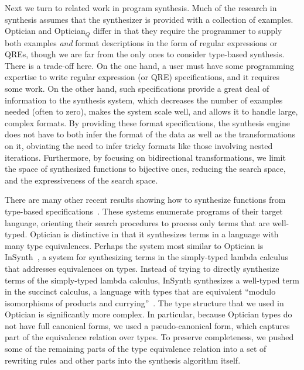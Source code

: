 \documentclass[acmsmall,review,anonymous]{acmart}
\begin{document}
Next we turn to related work in program synthesis. Much of the research in
synthesis 
assumes that the synthesizer is provided with a collection of examples.
Optician and Optician$_Q$  differ
in that they require the programmer to supply both examples {\em and}
format descriptions in the form of regular expressions or QREs, though we are
far from the only ones to consider type-based synthesis.
There is a trade-off here.  On the one hand, a user must have some programming
expertise to write regular expression (or QRE) specifications, and it requires
some work. On the other hand, such specifications provide a great deal of
information to the synthesis system, which decreases the number of examples
needed (often to zero), makes the system scale well, and allows it to handle
large, complex formats.  By providing these format specifications, the 
synthesis engine does not have to both infer the format of the data as well as
the transformations on it, obviating the need to infer tricky formats like
those involving nested iterations. Furthermore, by focusing on bidirectional
transformations, we limit the space of synthesized functions to bijective ones,
reducing the search space, and the expressiveness of the search space.

There are many other recent results showing how to synthesize functions from
type-based
specifications~\cite{augustsson-2004,osera+:pldi15,feser-pldi-2015,scherer-icfp-2015,frankle+:popl16,armando+:pldi16}.
These systems enumerate programs of their target language, orienting their
search procedures to process only terms that are well-typed.
Optician is distinctive in that it synthesizes terms in a language with many
type equivalences.
Perhaps the system most similar to Optician is InSynth~\cite{gvero-pldi-2013}, a
system for synthesizing terms in the simply-typed lambda calculus that addresses
equivalences on types. Instead of trying to directly synthesize terms of the
simply-typed lambda calculus, InSynth synthesizes a well-typed term
in the succinct calculus, a language with types
that are equivalent ``modulo isomorphisms of products and
currying''~\cite{gvero-pldi-2013}. The type structure that we used in Optician
is significantly more complex.  In particular, because Optician types do not
have full canonical forms, we used a pseudo-canonical form, which captures part
of the equivalence relation over types. To preserve completeness, we pushed
some of the remaining parts of the type equivalence relation into a set of
rewriting rules and other parts into the synthesis algorithm itself.
\end{document}

